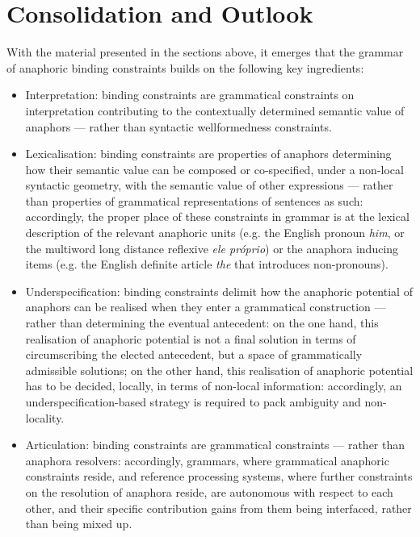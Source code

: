 \documentclass[output=paper
	        ,collection
	        ,collectionchapter
 	        ,biblatex
                ,babelshorthands
                ,newtxmath
                ,draftmode
                ,colorlinks, citecolor=brown
]{langscibook}
\begin{document}
\section{Consolidation and Outlook \label{outlook}}


With the material presented in the sections above, it emerges that the grammar 
of anaphoric binding constraints builds on the following key ingredients:


\begin{itemize}

\item Interpretation: binding constraints are grammatical constraints on interpretation 
contributing to the contextually determined
semantic value of anaphors --- rather than syntactic wellformedness constraints.

\item Lexicalisation: binding constraints are properties of 
anaphors determining how their semantic value 
can be composed or co-specified, under a non-local syntactic geometry, with the
semantic value of other expressions --- rather than properties of grammatical
representations of sentences as such: accordingly, the
proper place of these constraints in grammar is at the lexical description of 
the relevant anaphoric units (e.g. the English pronoun {\em him}, or the  multiword long distance reflexive {\em ele pr\'{o}prio}) or the anaphora inducing items (e.g. the English definite article {\em the} that introduces non-pronouns).

\item Underspecification: binding constraints delimit how the
anaphoric potential of anaphors can be realised when they
enter a grammatical construction --- rather than determining the eventual antecedent: 
on the one hand, this realisation of anaphoric potential is not a final solution in terms of circumscribing
the elected antecedent, but a space of grammatically admissible solutions;
on the other hand, this realisation of anaphoric potential has to be decided, locally,
in terms of non-local information: accordingly, an underspecification-based
strategy is required to pack ambiguity and non-locality.

\item Articulation: binding constraints are grammatical constraints --- rather than 
anaphora resolvers: accordingly, grammars, where grammatical ana\-phoric
constraints reside, and reference processing systems, where further
constraints on the resolution of anaphora reside,
are autonomous with respect to each other, and their specific contribution gains
from them being interfaced, rather than being mixed up.
\end{itemize}
\end{document}
